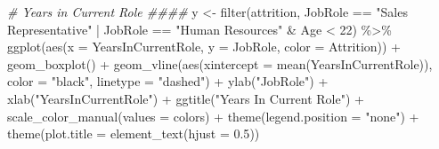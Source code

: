 \documentclass[
]{article}
\newenvironment{Shaded}{\begin{snugshade}}{\end{snugshade}}
\newcommand{\AttributeTok}[1]{\textcolor[rgb]{0.77,0.63,0.00}{#1}}
\newcommand{\CommentTok}[1]{\textcolor[rgb]{0.56,0.35,0.01}{\textit{#1}}}
\newcommand{\DecValTok}[1]{\textcolor[rgb]{0.00,0.00,0.81}{#1}}
\newcommand{\FloatTok}[1]{\textcolor[rgb]{0.00,0.00,0.81}{#1}}
\newcommand{\FunctionTok}[1]{\textcolor[rgb]{0.00,0.00,0.00}{#1}}
\newcommand{\NormalTok}[1]{#1}
\newcommand{\OtherTok}[1]{\textcolor[rgb]{0.56,0.35,0.01}{#1}}
\newcommand{\SpecialCharTok}[1]{\textcolor[rgb]{0.00,0.00,0.00}{#1}}
\newcommand{\StringTok}[1]{\textcolor[rgb]{0.31,0.60,0.02}{#1}}
\begin{document}
\begin{Shaded}
\begin{Highlighting}[]
\CommentTok{\# Years in Current Role \#\#\#\#}
\NormalTok{y }\OtherTok{\textless{}{-}} \FunctionTok{filter}\NormalTok{(attrition, JobRole }\SpecialCharTok{==} \StringTok{"Sales Representative"} \SpecialCharTok{|}\NormalTok{ JobRole }\SpecialCharTok{==} \StringTok{"Human Resources"} \SpecialCharTok{\&}\NormalTok{ Age }\SpecialCharTok{\textless{}} \DecValTok{22}\NormalTok{) }\SpecialCharTok{\%\textgreater{}\%}
  \FunctionTok{ggplot}\NormalTok{(}\FunctionTok{aes}\NormalTok{(}\AttributeTok{x =}\NormalTok{ YearsInCurrentRole, }\AttributeTok{y =}\NormalTok{ JobRole, }\AttributeTok{color =}\NormalTok{ Attrition)) }\SpecialCharTok{+}
  \FunctionTok{geom\_boxplot}\NormalTok{() }\SpecialCharTok{+}
  \FunctionTok{geom\_vline}\NormalTok{(}\FunctionTok{aes}\NormalTok{(}\AttributeTok{xintercept =} \FunctionTok{mean}\NormalTok{(YearsInCurrentRole)), }\AttributeTok{color =} \StringTok{"black"}\NormalTok{, }\AttributeTok{linetype =} \StringTok{"dashed"}\NormalTok{) }\SpecialCharTok{+}
  \FunctionTok{ylab}\NormalTok{(}\StringTok{"JobRole"}\NormalTok{) }\SpecialCharTok{+}
  \FunctionTok{xlab}\NormalTok{(}\StringTok{"YearsInCurrentRole"}\NormalTok{) }\SpecialCharTok{+}
  \FunctionTok{ggtitle}\NormalTok{(}\StringTok{"Years In Current Role"}\NormalTok{) }\SpecialCharTok{+}
  \FunctionTok{scale\_color\_manual}\NormalTok{(}\AttributeTok{values =}\NormalTok{ colors) }\SpecialCharTok{+}
  \FunctionTok{theme}\NormalTok{(}\AttributeTok{legend.position =} \StringTok{"none"}\NormalTok{) }\SpecialCharTok{+}
  \FunctionTok{theme}\NormalTok{(}\AttributeTok{plot.title =} \FunctionTok{element\_text}\NormalTok{(}\AttributeTok{hjust =} \FloatTok{0.5}\NormalTok{)) }


\end{Highlighting}
\end{Shaded}
\end{document}
